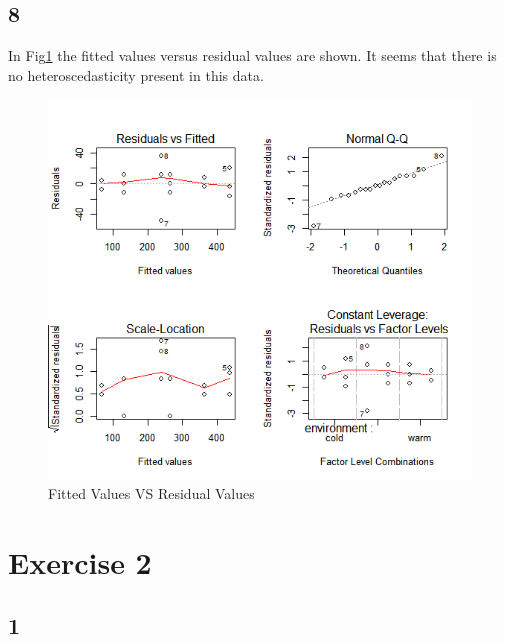 \documentclass{article}
\begin{document}
    \subsection*{8}
      In Fig\ref{fig:FitVSRes} the fitted values versus residual values are shown.
      It seems that there is no heteroscedasticity present in this data.
      \begin{figure}[H]
          \centering
          \includegraphics[scale=0.4]{../results/FitVSRes.png} 
          \caption{Fitted Values VS Residual Values}
          \label{fig:FitVSRes}
      \end{figure}
    
    
  \section*{Exercise 2}
    \subsection*{1}
     
\end{document}
